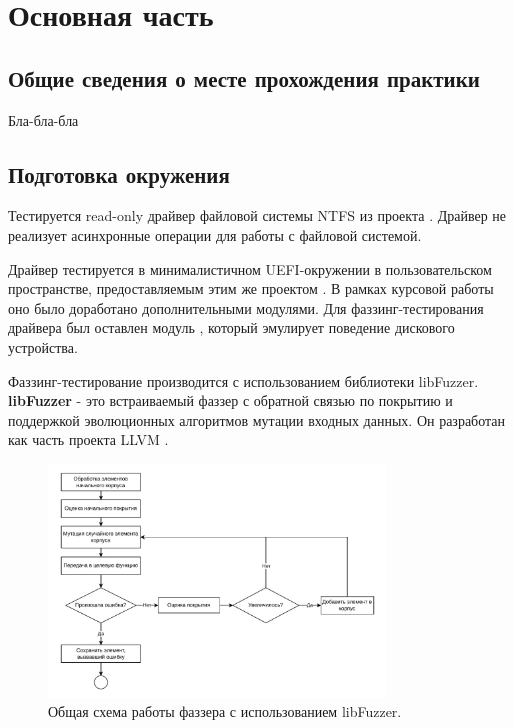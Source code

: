 \section{Основная часть}
\subsection{Общие сведения о месте прохождения практики}

Бла-бла-бла

\subsection{Подготовка окружения}
Тестируется read-only драйвер файловой системы NTFS из проекта  \cite{OpenCorePkgNtfs}. Драйвер не реализует асинхронные операции для работы с файловой системой.

Драйвер тестируется в минималистичном UEFI-окружении в пользовательском пространстве, предоставляемым этим же проектом \cite{OpenCorePkgUser}. В рамках курсовой работы оно было доработано дополнительными модулями. Для фаззинг-тестирования драйвера был оставлен модуль , который эмулирует поведение дискового устройства.

Фаззинг-тестирование производится с использованием библиотеки libFuzzer.  \textbf{libFuzzer} - это встраиваемый фаззер с обратной связью по покрытию и поддержкой эволюционных алгоритмов мутации входных данных. Он разработан как часть проекта LLVM \cite{Libfuzzer}.

\begin{figure}[htbp]
	\centering %
	\includegraphics[width=0.8\textwidth]{Piclibfuzz.pdf} %
	\caption{Общая схема работы фаззера с использованием libFuzzer.} %
	\label{pic:ilibfuzz} %
\end{figure}

